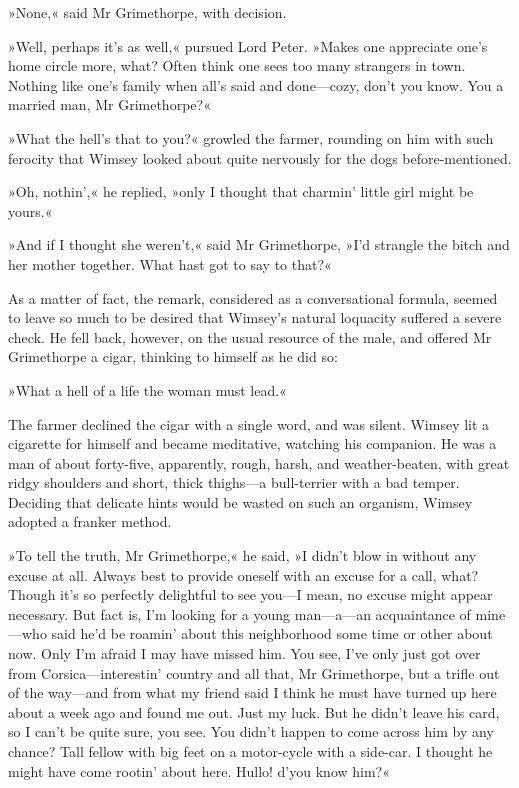 »None,« said Mr Grimethorpe, with decision.

»Well, perhaps it's as well,« pursued Lord Peter. »Makes one appreciate one's home circle more, what? Often think one sees too many strangers in town. Nothing like one's family when all's said and done\allowbreak---\allowbreak cozy, don't you know. You a married man, Mr Grimethorpe?«

»What the hell's that to you?« growled the farmer, rounding on him with such ferocity that Wimsey looked about quite nervously for the dogs before-mentioned.

»Oh, nothin',« he replied, »only I thought that charmin' little girl might be yours.«

»And if I thought she weren't,« said Mr Grimethorpe, »I'd strangle the bitch and her mother together. What hast got to say to that?«

As a matter of fact, the remark, considered as a conversational formula, seemed to leave so much to be desired that Wimsey's natural loquacity suffered a severe check. He fell back, however, on the usual resource of the male, and offered Mr Grimethorpe a cigar, thinking to himself as he did so:

»What a hell of a life the woman must lead.«

The farmer declined the cigar with a single word, and was silent.  Wimsey lit a cigarette for himself and became meditative, watching his companion. He was a man of about forty-five, apparently, rough, harsh, and weather-beaten, with great ridgy shoulders and short, thick thighs\allowbreak---\allowbreak a bull-terrier with a bad temper. Deciding that delicate hints would be wasted on such an organism, Wimsey adopted a franker method.

»To tell the truth, Mr Grimethorpe,« he said, »I didn't blow in without any excuse at all. Always best to provide oneself with an excuse for a call, what? Though it's so perfectly delightful to see you\allowbreak---\allowbreak I mean, no excuse might appear necessary. But fact is, I'm looking for a young man\allowbreak---\allowbreak a---an acquaintance of mine\allowbreak---\allowbreak who said he'd be roamin' about this neighborhood some time or other about now. Only I'm afraid I may have missed him. You see, I've only just got over from Corsica\allowbreak---\allowbreak interestin' country and all that, Mr Grimethorpe, but a trifle out of the way\allowbreak---\allowbreak and from what my friend said I think he must have turned up here about a week ago and found me out. Just my luck.  But he didn't leave his card, so I can't be quite sure, you see. You didn't happen to come across him by any chance? Tall fellow with big feet on a motor-cycle with a side-car. I thought he might have come rootin' about here. Hullo! d'you know him?«


